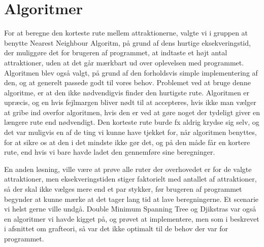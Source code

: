 \section{Algoritmer}
For at beregne den korteste rute mellem attraktionerne, valgte vi i gruppen at benytte Nearest Neighbour Algoritm, på grund af dens hurtige eksekveringstid, der muliggøre det for brugeren af programmet, at indtaste et højt antal attraktioner, uden at det går mærkbart ud over oplevelsen med programmet. Algoritmen blev også valgt, på grund af den forholdsvis simple implementering af den, og at generelt passede godt til vores behov. Problemet ved at bruge denne algoritme, er at den ikke nødvendigvis finder den hurtigste rute. Algoritmen er upræcis, og en hvis fejlmargen bliver nødt til at accepteres, hvis ikke man vælger at gribe ind overfor algoritmen, hvis den er ved at gøre noget der tydeligt giver en længere rute end nødvendigt. Den korteste rute burde fx aldrig krydse sig selv, og det var muligvis en af de ting vi kunne have tjekket for, når algoritmen benyttes, for at sikre os at den i det mindste ikke gør det, og på den måde får en kortere rute, end hvis vi bare havde ladet den gennemføre sine beregninger. 

En anden løsning, ville være at prøve alle ruter der overhovedet er for de valgte attraktioner, men eksekveringstiden stiger faktorielt med antallet af attraktioner, så der skal ikke vælges mere end et par stykker, før brugeren af programmet begynder at kunne mærke at det tager lang tid at lave beregningerne. Et scenarie vi helst gerne ville undgå.
Double Minimum Spanning Tree og Djikstras var også en algoritmer vi havde kigget på, og prøvet at implementere, men som i beskrevet i afsnittet om grafteori, så var det ikke optimalt til de behov der var for programmet. 

